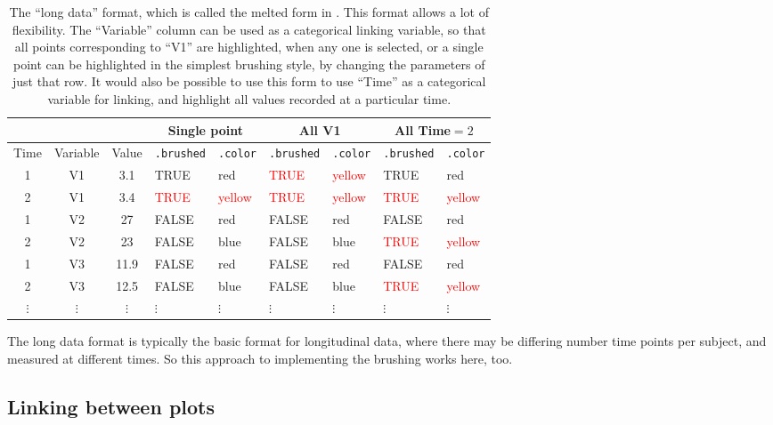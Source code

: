 \documentclass[12pt]{article}
\providecommand{\tabularnewline}{\\}
\begin{document}
\begin{center}
\begin{table}[htp]
\begin{centering}
\begin{tabular}{|c|cc|ll||ll||ll|}
\hline 
\multicolumn{1}{|c}{} & \multicolumn{2}{c|}{} & \multicolumn{2}{c||}{Single point}& \multicolumn{2}{c||}{All V1}& \multicolumn{2}{c|}{All Time$=2$}\tabularnewline
\hline 
Time & Variable & Value & \texttt{.brushed} & \texttt{.color} & \texttt{.brushed} & \texttt{.color} & \texttt{.brushed} & \texttt{.color}\tabularnewline
\hline 
1 & V1 & 3.1 & TRUE & red & \textcolor{red}{TRUE} & \textcolor{red}{yellow} & TRUE & red \tabularnewline
2 & V1 & 3.4 & \textcolor{red}{TRUE} & \textcolor{red}{yellow} & \textcolor{red}{TRUE} & \textcolor{red}{yellow} & \textcolor{red}{TRUE} & \textcolor{red}{yellow}\tabularnewline
1 & V2 & 27 & FALSE & red & FALSE & red & FALSE & red\tabularnewline
2 & V2 & 23 & FALSE & blue & FALSE & blue & \textcolor{red}{TRUE} & \textcolor{red}{yellow} \tabularnewline
1 & V3 & 11.9 & FALSE & red & FALSE & red & FALSE & red \tabularnewline
2 & V3 & 12.5 & FALSE & blue & FALSE & blue & \textcolor{red}{TRUE} & \textcolor{red}{yellow}\tabularnewline
$\vdots$ & $\vdots$ & $\vdots$ & $\vdots$ & $\vdots$ & $\vdots$ & $\vdots$ & $\vdots$ & $\vdots$ \tabularnewline
\hline 
\end{tabular}
\end{centering}
\caption{\label{tab:long-data}The ``long data'' format, which is called the melted form in \citet{reshape}. This format allows a lot of flexibility. The ``Variable'' column can be used as a categorical linking variable, so that all points corresponding to ``V1'' are highlighted, when any one is selected, or a single point can be highlighted in the simplest brushing style, by changing the parameters of just that row. It would also be possible to use this form to use ``Time'' as a categorical variable for linking, and highlight all values recorded at a particular time. }
\end{table}
\end{center}

The long data format is typically the basic format
for longitudinal data, where there may be differing
number time points per subject, and measured at
different times. So this approach to implementing
the brushing works here, too.


\subsection{Linking between plots}
\end{document}
